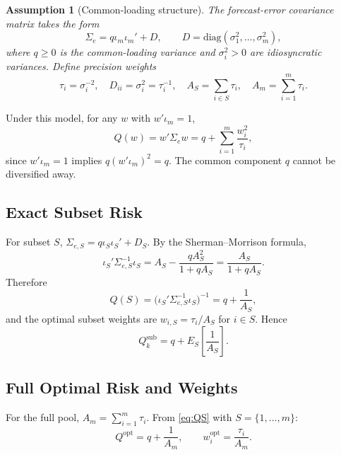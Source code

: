 \documentclass[12pt,a4paper]{article}
\newtheorem{assumption}{Assumption}
\theoremstyle{definition}
\begin{document}
\begin{assumption}[Common-loading structure]\label{ass:cl}
The forecast-error covariance matrix takes the form
\begin{equation}\label{eq:Sigma}
\Sigma_e = q\iota_m\iota_m' + D, \qquad
D = \mathrm{diag}(\sigma_1^2,\ldots,\sigma_m^2),
\end{equation}
where $q\geq 0$ is the common-loading variance and $\sigma_i^2>0$ are
idiosyncratic variances. Define precision weights
\begin{equation}
\tau_i = \sigma_i^{-2},\quad D_{ii}=\sigma_i^2=\tau_i^{-1},\quad
A_S=\sum_{i\in S}\tau_i,\quad A_m=\sum_{i=1}^m\tau_i.
\end{equation}
\end{assumption}

Under this model, for any $w$ with $w'\iota_m=1$,
\begin{equation}
Q(w) = w'\Sigma_e w = q + \sum_{i=1}^m\frac{w_i^2}{\tau_i},
\end{equation}
since $w'\iota_m=1$ implies $q(w'\iota_m)^2=q$. The common component $q$
cannot be diversified away.

\subsection{Exact Subset Risk}

For subset $S$, $\Sigma_{e,S}=q\iota_S\iota_S'+D_S$. By the
Sherman--Morrison formula,
\begin{equation}
\iota_S'\Sigma_{e,S}^{-1}\iota_S
= A_S - \frac{qA_S^2}{1+qA_S} = \frac{A_S}{1+qA_S}.
\end{equation}
Therefore
\begin{equation}\label{eq:QS}
Q(S) = \bigl(\iota_S'\Sigma_{e,S}^{-1}\iota_S\bigr)^{-1}
= q + \frac{1}{A_S},
\end{equation}
and the optimal subset weights are $w_{i,S}=\tau_i/A_S$ for $i\in S$.
Hence
\begin{equation}\label{eq:Qsub_exact}
Q_k^{\mathrm{sub}} = q + E_S\!\left[\frac{1}{A_S}\right].
\end{equation}

\subsection{Full Optimal Risk and Weights}

For the full pool, $A_m=\sum_{i=1}^m\tau_i$. From \eqref{eq:QS} with $S=\{1,\ldots,m\}$:
\begin{equation}\label{eq:Qopt_cl}
Q^{\mathrm{opt}} = q + \frac{1}{A_m}, \qquad
w_i^{\mathrm{opt}} = \frac{\tau_i}{A_m}.
\end{equation}
\end{document}
